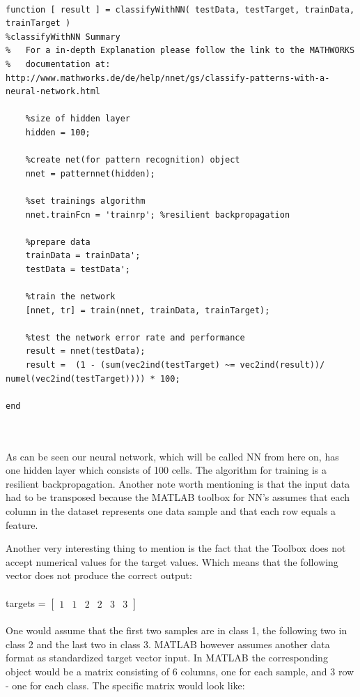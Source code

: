 \documentclass[subfigure,epsfig,fleqn,float,ausarbeitung]{scrartcl}
\begin{document}
\begin{lstlisting}

function [ result ] = classifyWithNN( testData, testTarget, trainData, trainTarget )
%classifyWithNN Summary
%   For a in-depth Explanation please follow the link to the MATHWORKS 
%   documentation at: http://www.mathworks.de/de/help/nnet/gs/classify-patterns-with-a-neural-network.html

	%size of hidden layer
	hidden = 100;
      
	%create net(for pattern recognition) object
	nnet = patternnet(hidden);
      
	%set trainings algorithm
	nnet.trainFcn = 'trainrp'; %resilient backpropagation
      
	%prepare data
	trainData = trainData';
	testData = testData';
      
	%train the network
	[nnet, tr] = train(nnet, trainData, trainTarget);
      
	%test the network error rate and performance
	result = nnet(testData);
	result =  (1 - (sum(vec2ind(testTarget) ~= vec2ind(result))/ numel(vec2ind(testTarget)))) * 100;
	
end

\end{lstlisting}
~\\ ~\\
As can be seen our neural network, which will be called NN from here on, has one hidden layer which consists of 100 cells. The algorithm for training is a resilient backpropagation. Another note worth mentioning is that the input data had to be transposed because the MATLAB toolbox for NN’s assumes that each column in the dataset represents one data sample and that each row equals a feature.

Another very interesting thing to mention is the fact that the Toolbox does not accept numerical values for the target values. Which means that the following vector does not produce the correct output:
~\\ ~\\
targets = $\begin{bmatrix}
1 & 1 & 2 & 2 & 3 & 3
\end{bmatrix}$
~\\ ~\\
One would assume that the first two samples are in class 1, the following two in class 2 and the last two in class 3. MATLAB however assumes another data format as standardized target vector input. In MATLAB the corresponding object would be a matrix consisting of 6 columns, one for each sample, and 3 row - one for each class. The specific matrix would look like:
\end{document}
